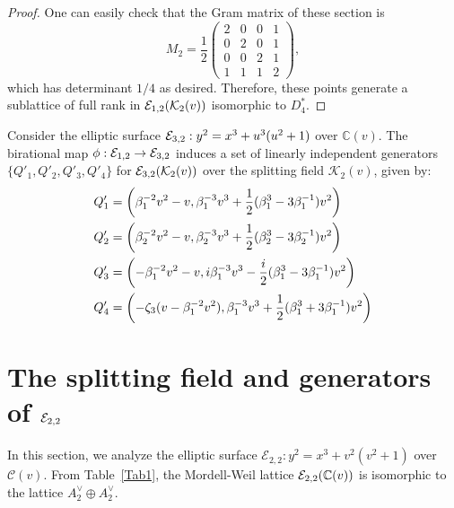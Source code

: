 \documentclass[11pt]{amsart}
\begin{document}
\begin{proof}
	One can easily check that the Gram matrix of  these section is 
\begin{equation}\label{ma4}
	M_2=\frac{1}{2}
	\begin{pmatrix}
	2 & 0 & 0 & 1 
	\\
	0 & 2 & 0 & 1 
	\\
	0 & 0 & 2 & 1 
	\\
	1 & 1 &1 & 2 	
	\end{pmatrix},
\end{equation}
which has determinant $1/4$ as desired.	
	Therefore, these points generate a sublattice of full rank in ${\mathcal E}_{1,2}(\mathcal{K}_2(v))$ isomorphic to $D_4^*$.	
\end{proof}

\begin{cor} 
	Consider the elliptic surface ${\mathcal E}_{3,2}: y^2 = x^3 + u^3(u^2+1)$ over $\mathbb{C}(v)$.
	The birational map $\phi: {\mathcal E}_{1,2} \rightarrow {\mathcal E}_{3,2}$  induces a set of linearly independent generators $\{Q'_1, Q'_2, Q'_3, Q'_4\}$ for ${\mathcal E}_{3,2}(\mathcal{K}_2(v))$ over the splitting field $\mathcal{K}_2(v)$, given by:
\begin{align}
	Q'_1 &= \left( \beta_1^{-2}v^2 - v,   \beta_1^{-3}v^3 + \frac{1}{2}(\beta_1^3 - 3\beta_1^{-1})v^2 \right) \notag \\
	Q'_2 &= \left( \beta_2^{-2}v^2 - v,  \beta_2^{-3}v^3 + \frac{1}{2}(\beta_2^3 - 3\beta_2^{-1})v^2 \right) \notag \\
		Q'_3 &= \left( -\beta_1^{-2}v^2 - v,   i\beta_1^{-3}v^3 - \frac{i}{2}(\beta_1^3 - 3\beta_1^{-1})v^2 \right) \notag \\
	Q'_4 &= \left( - \zeta_3 (v-\beta_1^{-2}v^2 ),   \beta_1^{-3}v^3 + \frac{1}{2}( \beta_1^3 + 3\beta_1^{-1})v^2 \right) \label{Q-(3,2)}
\end{align}
\end{cor}







\section{The splitting field and generators of ${\mathcal E}_{2,2}$}
\label{A2+A2-(2,2)}

In this section, we analyze the elliptic surface   $\mathcal{E}_{2,2}: y^2 = x^3 + v^2(v^2+1)$ over $\mathcal{C}(v)$. From Table~\ref{Tab1}, the Mordell-Weil lattice  ${\mathcal E}_{2,2} ({\mathbb C}(v))$ is isomorphic to the lattice $A_2^\vee \oplus A_2^\vee$.
\end{document}
